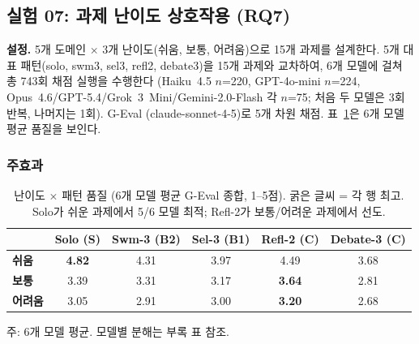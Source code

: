 \documentclass[a4paper,11pt]{article}
\begin{document}
\subsection{실험 07: 과제 난이도 상호작용 (RQ7)}
\label{sec:exp07}

\textbf{설정.} 5개 도메인 $\times$ 3개 난이도(쉬움, 보통, 어려움)으로 15개 과제를 설계한다. 5개 대표 패턴(solo, swm3, sel3, refl2, debate3)을 15개 과제와 교차하여, 6개 모델에 걸쳐 총 743회 채점 실행을 수행한다 (Haiku~4.5 $n$=220, GPT-4o-mini $n$=224, Opus~4.6/GPT-5.4/Grok~3~Mini/Gemini-2.0-Flash 각 $n$=75; 처음 두 모델은 3회 반복, 나머지는 1회). G-Eval (claude-sonnet-4-5)로 5개 차원 채점. 표~\ref{tab:difficulty-heatmap}은 6개 모델 평균 품질을 보인다.

\subsubsection{주효과}

\begin{table}[H]
\centering
\caption{난이도 $\times$ 패턴 품질 (6개 모델 평균 G-Eval 종합, 1--5점). 굵은 글씨 = 각 행 최고. Solo가 쉬운 과제에서 5/6 모델 최적; Refl-2가 보통/어려운 과제에서 선도.}
\label{tab:difficulty-heatmap}
{\small
\begin{tabular}{lccccc}
\toprule
 & Solo (S) & Swm-3 (B2) & Sel-3 (B1) & Refl-2 (C) & Debate-3 (C) \\
\midrule
\textbf{쉬움}   & \textbf{4.82} & 4.31 & 3.97 & 4.49 & 3.68 \\
\textbf{보통}   & 3.39 & 3.31 & 3.17 & \textbf{3.64} & 2.81 \\
\textbf{어려움} & 3.05 & 2.91 & 3.00 & \textbf{3.20} & 2.68 \\
\bottomrule
\end{tabular}
}

\smallskip
{\footnotesize 주: 6개 모델 평균. 모델별 분해는 부록 표 참조.}
\end{table}
\end{document}
